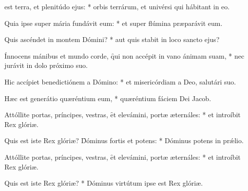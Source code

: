 \begin{psalmus}

     est terra, et plenitúdo ejus: * orbis terrárum, et univérsi qui hábitant in eo.

    Quia ipse super mária fundávit eum: * et super flúmina præparávit eum.

    Quis ascéndet in montem Dómini? * aut quis stabit in loco sancto ejus?

    Ínnocens mánibus et mundo corde, \f qui non accépit in vano ánimam suam, * nec jurávit in dolo próximo suo.

    Hic accípiet benedictiónem a Dómino: * et misericórdiam a Deo, salutári suo.

    Hæc est generátio quæréntium eum, * quæréntium fáciem Dei Jacob.

    Attóllite portas, príncipes, vestras, \f et elevámini, portæ æternáles: * et introíbit Rex glóriæ.

    Quis est iste Rex glóriæ? \f Dóminus fortis et potens: * Dóminus potens in prǽlio.

    Attóllite portas, príncipes, vestras, \f et elevámini, portæ æternáles: * et introíbit Rex glóriæ.

    Quis est iste Rex glóriæ? * Dóminus virtútum ipse est Rex glóriæ.

\end{psalmus}
